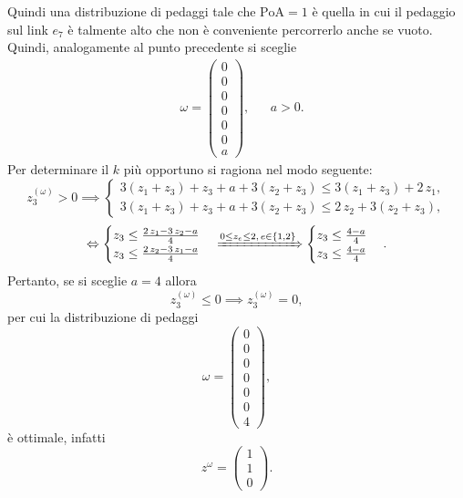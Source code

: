\begin{alphaparts}
Quindi una distribuzione di pedaggi tale che \(\text{PoA} = 1\) è quella in cui il pedaggio sul link $e_7$ è talmente alto che non è conveniente percorrerlo anche se vuoto. Quindi, analogamente al punto precedente si sceglie 
\begin{align}&\omega =  \begin{pmatrix}
        				0 \\ 0 \\  0 \\ 0 \\ 0 \\ 0 \\ a
    			     \end{pmatrix},&&a>0.\nonumber \end{align}
Per determinare il $k$ più opportuno si ragiona nel modo seguente:
\[ z_{3}^{(\omega)} > 0 \implies \begin{cases} 3\left(z_1 + z_3\right) + z_3 + a +3\left(z_2 + z_3\right) \le 3\left(z_1 + z_3 \right) + 2\,z_1, \\ 3\left(z_1 + z_3\right) + z_3 + a +3\left(z_2 + z_3\right) \le  2\,z_2 + 3\left(z_2 + z_3 \right), \end{cases} \]
\[ \Leftrightarrow \begin{cases} z_3 \le \frac{2\,z_1-3\,z_2-a}{4} \\ z_3 \le \frac{2\,z_2-3\,z_1-a}{4} \end{cases} \xRightarrow[]{0\le z_e \le 2, \, e\in\{1,2\}}\begin{cases} z_3 \le \frac{4-a}{4} \\ z_3 \le \frac{4-a}{4} \end{cases}.\]
Pertanto, se si sceglie $a=4$ allora 
\[z_{3}^{(\omega)} \le 0 \implies  z_{3}^{(\omega)} = 0,\]
per cui la distribuzione di pedaggi 
\[\omega =  \begin{pmatrix}
        				0 \\ 0 \\  0 \\ 0 \\ 0 \\ 0 \\ 4
    			     \end{pmatrix},\]
è ottimale, infatti
\[ z^{\omega} = \begin{pmatrix}
        1 \\ 1 \\ 0
    \end{pmatrix}.\]


\end{alphaparts}